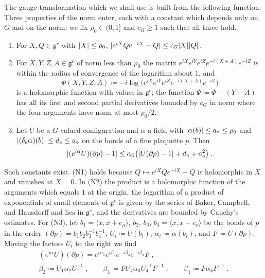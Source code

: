 \documentclass[11pt]{preprint}
\DeclarePairedDelimiter{\abs}{\lvert}{\rvert}
\numberwithin{equation}{section}
\theoremstyle{definition}
\theoremstyle{remark}
\theoremstyle{plain}
\begin{document}
The gauge transformation which we shall use is built from the following function. Three properties of the norm enter, each with a constant which depends only on $G$ and on the norm; we fix $\rho_0 \in (0, 1]$ and $c_G \geq 1$ such that all three hold.
\begin{enumerate}[label=(N\arabic*)]
\item For $X, Q \in \mathfrak g^c$ with $\abs X \leq \rho_0$, $\abs{e^{iX}Qe^{-iX} - Q} \leq c_G\abs X\abs Q$.
\item For $X, Y, Z, A \in \mathfrak g^c$ of norm less than $\rho_0$ the matrix $e^{iX}e^{iY}e^{iZ}e^{-i(X + A)}e^{-iZ}$ is within the radius of convergence of the logarithm about $1$, and
\begin{equation}\label{eq:reduction-function}
    \Phi(X, Y, Z, A) \coloneqq -i\log\bigl(e^{iX}e^{iY}e^{iZ}e^{-i(X + A)}e^{-iZ}\bigr)
\end{equation}
is a holomorphic function with values in $\mathfrak g^c$; the function $\Psi \coloneqq \Phi - (Y - A)$ has all its first and second partial derivatives bounded by $c_G$ in norm where the four arguments have norm at most $\rho_0/2$.
\item Let $U$ be a $G$-valued configuration and $\alpha$ a field with $\abs{\alpha(b)} \leq a_\circ \leq \rho_0$ and $\abs{(\delta_e\alpha)(b)} \leq d_\circ \leq a_\circ$ on the bonds of a fine plaquette $p$. Then
\begin{equation}\label{eq:complex-curvature}
    \abs{(e^{i\alpha}U)(\partial p) - 1} \leq c_G\bigl(\abs{U(\partial p) - 1} + d_\circ + a_\circ^2\bigr)\;.
\end{equation}
\end{enumerate}
Such constants exist. (N1) holds because $Q \mapsto e^{iX}Qe^{-iX} - Q$ is holomorphic in $X$ and vanishes at $X = 0$. In (N2) the product is a holomorphic function of the arguments which equals $1$ at the origin, the logarithm of a product of exponentials of small elements of $\mathfrak g^c$ is given by the series of Baker, Campbell, and Hausdorff and lies in $\mathfrak g^c$, and the derivatives are bounded by Cauchy's estimates. For (N3), let $b_1 = \langle x, x + e_\mu\rangle$, $b_2$, $b_3$, $b_4 = \langle x, x + e_\nu\rangle$ be the bonds of $p$ in the order $(\partial p) = b_1b_2b_3^{-1}b_4^{-1}$, $U_i \coloneqq U(b_i)$, $\alpha_i \coloneqq \alpha(b_i)$, and $F \coloneqq U(\partial p)$. Moving the factors $U_i$ to the right we find
\begin{gather*}
    (e^{i\alpha}U)(\partial p) = e^{i\alpha_1}e^{i\beta_2}e^{-i\beta_3}e^{-i\beta_4}F\;,\\
    \beta_2 \coloneqq U_1\alpha_2U_1^{-1}\;,
    \qquad
    \beta_3 \coloneqq FU_4\alpha_3U_4^{-1}F^{-1}\;,
    \qquad
    \beta_4 \coloneqq F\alpha_4F^{-1}\;.
\end{gather*}
\end{document}
